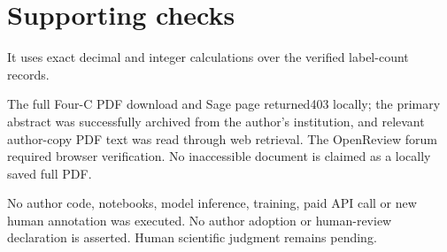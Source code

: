 \documentclass[10pt]{article}
\begin{document}
\section*{Supporting checks}
It uses exact decimal and integer calculations over the verified label-count records.\par
The full Four-C PDF download and Sage page returned403 locally; the primary abstract was successfully archived from the author’s institution, and relevant author-copy PDF text was read through web retrieval. The OpenReview forum required browser verification. No inaccessible document is claimed as a locally saved full PDF.\par
No author code, notebooks, model inference, training, paid API call or new human annotation was executed. No author adoption or human-review declaration is asserted. Human scientific judgment remains pending.\par
\end{document}
